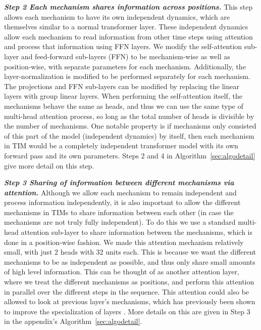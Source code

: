 \documentclass{article}
\begin{document}
{\bfseries \itshape Step 2 Each mechanism shares information across positions.} This step allows each mechanism to have its own independent dynamics, which are themselves similar to a normal transformer layer.  These independent dynamics allow each mechanism to read information from other time steps using attention and process that information using FFN layers.  We modify the self-attention sub-layer and feed-forward  sub-layers (FFN) to be mechanism-wise as well as position-wise, with separate parameters for each mechanism.  Additionally, the layer-normalization is modified to be performed separately for each mechanism.  The projections and FFN sub-layers can be modified by replacing the linear layers with group linear layers.  When performing the self-attention itself, the mechanisms behave the same as heads, and thus we can use the same type of multi-head attention process, so long as the total number of heads is divisible by the number of mechanisms.  One notable property is if mechanisms only consisted of this part of the model (independent dynamics) by itself, then each mechanism in TIM would be a completely independent transformer model with its own forward pass and its own parameters.  Steps 2 and 4 in  Algorithm~\ref{sec:algodetail} give more detail on this step.  


{\bfseries \itshape Step 3 Sharing of information between different mechanisms via attention.}  Although we allow each mechanism to remain independent and process information independently, it is also important to allow the different mechanisms in TIMs to share information between each other (in case the mechanisms are not truly fully independent).  To do this we use a standard multi-head attention sub-layer to share information between the mechanisms, which is done in a position-wise fashion.  We made this attention mechanism relatively small, with just 2 heads with 32 units each.  This is because we want the different mechanisms to be as independent as possible, and thus only share small amounts of high level information.  This can be thought of as another attention layer, where we treat the different mechanisms as positions, and perform this attention in parallel over the different steps in the sequence.  This attention could also be allowed to look at previous layer's mechanisms, which has previously been shown to improve the specialization of layers \citep{lamb2020neural}.  More details on this are given in Step 3 in the appendix's Algorithm~\ref{sec:algodetail}.  
\end{document}
